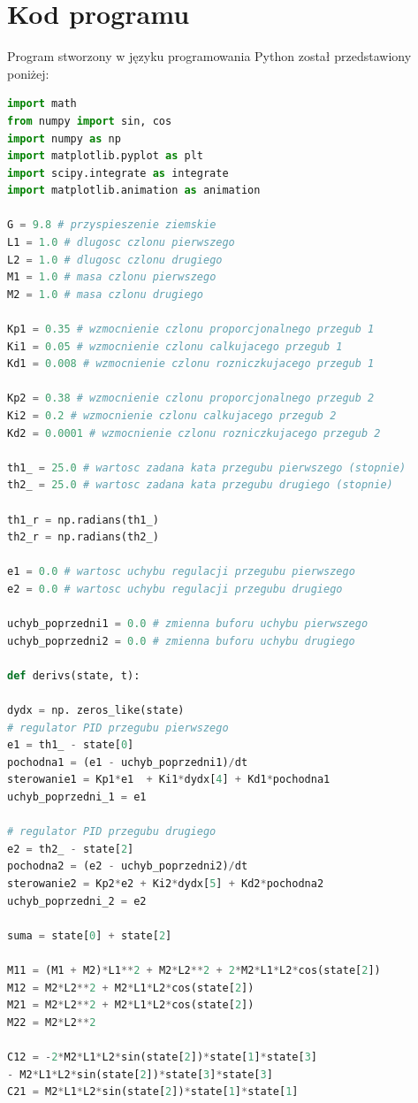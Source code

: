 \documentclass[fleqn,10pt]{physiome}
\begin{document}
\section{Kod programu}
Program stworzony w języku programowania Python został przedstawiony poniżej:
\newline
\begin{lstlisting}[language=Python]
import math
from numpy import sin, cos
import numpy as np
import matplotlib.pyplot as plt
import scipy.integrate as integrate
import matplotlib.animation as animation

G = 9.8 # przyspieszenie ziemskie
L1 = 1.0 # dlugosc czlonu pierwszego
L2 = 1.0 # dlugosc czlonu drugiego
M1 = 1.0 # masa czlonu pierwszego
M2 = 1.0 # masa czlonu drugiego

Kp1 = 0.35 # wzmocnienie czlonu proporcjonalnego przegub 1
Ki1 = 0.05 # wzmocnienie czlonu calkujacego przegub 1
Kd1 = 0.008 # wzmocnienie czlonu rozniczkujacego przegub 1

Kp2 = 0.38 # wzmocnienie czlonu proporcjonalnego przegub 2
Ki2 = 0.2 # wzmocnienie czlonu calkujacego przegub 2
Kd2 = 0.0001 # wzmocnienie czlonu rozniczkujacego przegub 2

th1_ = 25.0 # wartosc zadana kata przegubu pierwszego (stopnie)
th2_ = 25.0 # wartosc zadana kata przegubu drugiego (stopnie)

th1_r = np.radians(th1_)
th2_r = np.radians(th2_)

e1 = 0.0 # wartosc uchybu regulacji przegubu pierwszego
e2 = 0.0 # wartosc uchybu regulacji przegubu drugiego

uchyb_poprzedni1 = 0.0 # zmienna buforu uchybu pierwszego
uchyb_poprzedni2 = 0.0 # zmienna buforu uchybu drugiego

def derivs(state, t):

dydx = np. zeros_like(state)
# regulator PID przegubu pierwszego
e1 = th1_ - state[0]
pochodna1 = (e1 - uchyb_poprzedni1)/dt
sterowanie1 = Kp1*e1  + Ki1*dydx[4] + Kd1*pochodna1
uchyb_poprzedni_1 = e1

# regulator PID przegubu drugiego
e2 = th2_ - state[2]
pochodna2 = (e2 - uchyb_poprzedni2)/dt
sterowanie2 = Kp2*e2 + Ki2*dydx[5] + Kd2*pochodna2
uchyb_poprzedni_2 = e2
    
suma = state[0] + state[2]
    
M11 = (M1 + M2)*L1**2 + M2*L2**2 + 2*M2*L1*L2*cos(state[2])
M12 = M2*L2**2 + M2*L1*L2*cos(state[2])
M21 = M2*L2**2 + M2*L1*L2*cos(state[2])
M22 = M2*L2**2

C12 = -2*M2*L1*L2*sin(state[2])*state[1]*state[3]
- M2*L1*L2*sin(state[2])*state[3]*state[3]
C21 = M2*L1*L2*sin(state[2])*state[1]*state[1]


\end{lstlisting}
\end{document}
